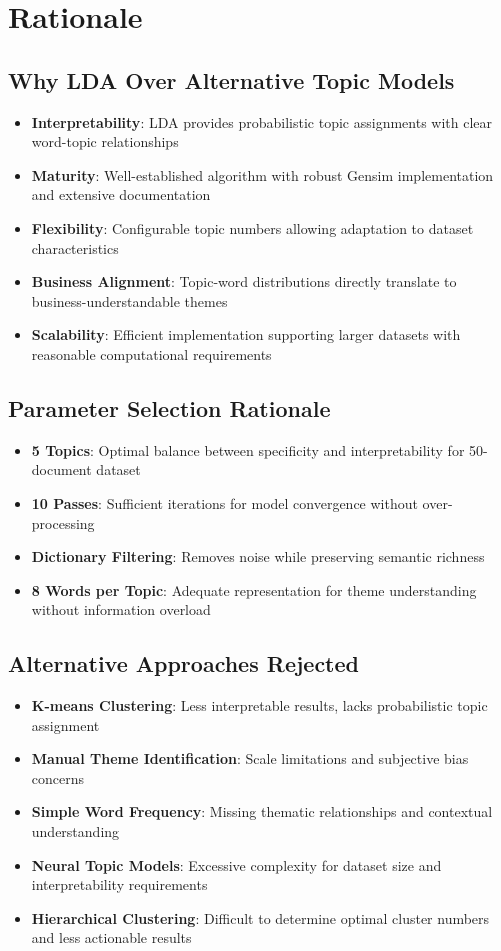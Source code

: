 \documentclass[11pt]{article}
\begin{document}
\section{Rationale}

\subsection{Why LDA Over Alternative Topic Models}
\begin{itemize}
\item \textbf{Interpretability}: LDA provides probabilistic topic assignments with clear word-topic relationships
\item \textbf{Maturity}: Well-established algorithm with robust Gensim implementation and extensive documentation
\item \textbf{Flexibility}: Configurable topic numbers allowing adaptation to dataset characteristics
\item \textbf{Business Alignment}: Topic-word distributions directly translate to business-understandable themes
\item \textbf{Scalability}: Efficient implementation supporting larger datasets with reasonable computational requirements
\end{itemize}

\subsection{Parameter Selection Rationale}
\begin{itemize}
\item \textbf{5 Topics}: Optimal balance between specificity and interpretability for 50-document dataset
\item \textbf{10 Passes}: Sufficient iterations for model convergence without over-processing
\item \textbf{Dictionary Filtering}: Removes noise while preserving semantic richness
\item \textbf{8 Words per Topic}: Adequate representation for theme understanding without information overload
\end{itemize}

\subsection{Alternative Approaches Rejected}
\begin{itemize}
\item \textbf{K-means Clustering}: Less interpretable results, lacks probabilistic topic assignment
\item \textbf{Manual Theme Identification}: Scale limitations and subjective bias concerns
\item \textbf{Simple Word Frequency}: Missing thematic relationships and contextual understanding
\item \textbf{Neural Topic Models}: Excessive complexity for dataset size and interpretability requirements
\item \textbf{Hierarchical Clustering}: Difficult to determine optimal cluster numbers and less actionable results
\end{itemize}
\end{document}
